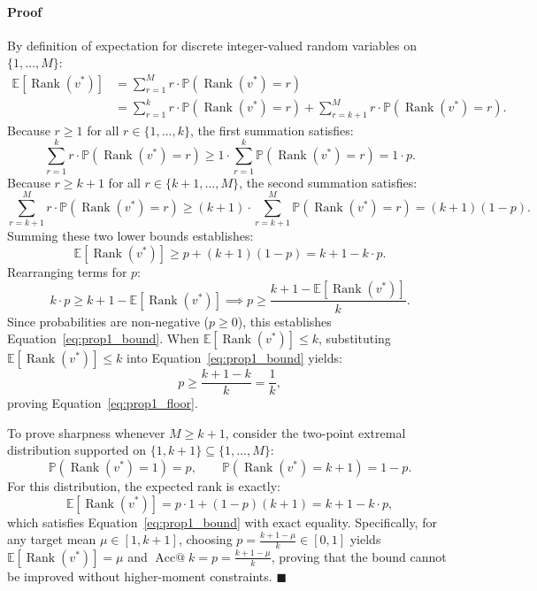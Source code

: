 \documentclass[10pt]{article}
\begin{document}
\paragraph{Proof}
By definition of expectation for discrete integer-valued random variables on $\{1, \dots, M\}$:
\begin{align}
\mathbb{E}[\operatorname{Rank}(v^*)] &= \sum_{r=1}^M r \cdot \mathbb{P}(\operatorname{Rank}(v^*) = r) \\
&= \sum_{r=1}^k r \cdot \mathbb{P}(\operatorname{Rank}(v^*) = r) + \sum_{r=k+1}^M r \cdot \mathbb{P}(\operatorname{Rank}(v^*) = r).
\end{align}
Because $r \ge 1$ for all $r \in \{1, \dots, k\}$, the first summation satisfies:
\begin{equation}
\sum_{r=1}^k r \cdot \mathbb{P}(\operatorname{Rank}(v^*) = r) \ge 1 \cdot \sum_{r=1}^k \mathbb{P}(\operatorname{Rank}(v^*) = r) = 1 \cdot p.
\end{equation}
Because $r \ge k + 1$ for all $r \in \{k+1, \dots, M\}$, the second summation satisfies:
\begin{equation}
\sum_{r=k+1}^M r \cdot \mathbb{P}(\operatorname{Rank}(v^*) = r) \ge (k + 1) \cdot \sum_{r=k+1}^M \mathbb{P}(\operatorname{Rank}(v^*) = r) = (k + 1)(1 - p).
\end{equation}
Summing these two lower bounds establishes:
\begin{equation}
\mathbb{E}[\operatorname{Rank}(v^*)] \ge p + (k + 1)(1 - p) = k + 1 - k \cdot p.
\end{equation}
Rearranging terms for $p$:
\begin{equation}
k \cdot p \ge k + 1 - \mathbb{E}[\operatorname{Rank}(v^*)] \implies p \ge \frac{k + 1 - \mathbb{E}[\operatorname{Rank}(v^*)]}{k}.
\end{equation}
Since probabilities are non-negative ($p \ge 0$), this establishes Equation~\eqref{eq:prop1_bound}. When $\mathbb{E}[\operatorname{Rank}(v^*)] \le k$, substituting $\mathbb{E}[\operatorname{Rank}(v^*)] \le k$ into Equation~\eqref{eq:prop1_bound} yields:
\begin{equation}
p \ge \frac{k + 1 - k}{k} = \frac{1}{k},
\end{equation}
proving Equation~\eqref{eq:prop1_floor}.

To prove sharpness whenever $M \ge k + 1$, consider the two-point extremal distribution supported on $\{1, k+1\} \subseteq \{1, \dots, M\}$:
\begin{equation}
\mathbb{P}(\operatorname{Rank}(v^*) = 1) = p, \qquad \mathbb{P}(\operatorname{Rank}(v^*) = k + 1) = 1 - p.
\end{equation}
For this distribution, the expected rank is exactly:
\begin{equation}
\mathbb{E}[\operatorname{Rank}(v^*)] = p \cdot 1 + (1 - p)(k + 1) = k + 1 - k \cdot p,
\end{equation}
which satisfies Equation~\eqref{eq:prop1_bound} with exact equality. Specifically, for any target mean $\mu \in [1, k+1]$, choosing $p = \frac{k+1-\mu}{k} \in [0, 1]$ yields $\mathbb{E}[\operatorname{Rank}(v^*)] = \mu$ and $\operatorname{Acc@}k = p = \frac{k+1-\mu}{k}$, proving that the bound cannot be improved without higher-moment constraints. \hfill $\blacksquare$
\end{document}
